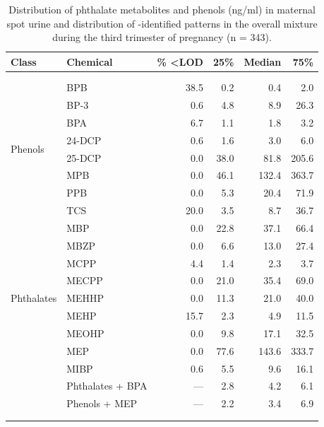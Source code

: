 \begingroup
\renewcommand{\arraystretch}{1.25}
\begin{table}[!ht] \centering 
  \caption[Distribution of phthalate metabolites and phenols]{Distribution of phthalate metabolites and phenols (ng/ml) in maternal spot urine and distribution of \bnmfc-identified patterns in the overall mixture during the third trimester of pregnancy (n = 343).}
  \label{tab:conc} 
\begin{tabular}{@{\extracolsep{5pt}} llrrrr} 
Class & Chemical & \% \textless LOD & 25\% & Median & 75\% \\ 
\hline 
\\[-3ex] \hline \\[-2.5ex]
\multirow{8}{*}{Phenols} & BPB    & 38.5 & 0.2  & 0.4 & 2.0 \\ 
& BP-3   & 0.6 & 4.8  & 8.9 & 26.3 \\ 
& BPA    & 6.7 & 1.1  & 1.8 & 3.2 \\ 
& 24-DCP & 0.6 & 1.6  & 3.0 & 6.0 \\ 
& 25-DCP & 0.0 & 38.0 & 81.8 & 205.6 \\ 
& MPB    & 0.0 & 46.1 & 132.4 & 363.7 \\ 
& PPB    & 0.0 & 5.3  & 20.4 & 71.9 \\ 
& TCS    & 20.0 & 3.5  & 8.7 & 36.7 \\ 
\hline
\multirow{9}{*}{Phthalates} & MBP    & 0.0 & 22.8 & 37.1 & 66.4 \\ 
& MBZP   & 0.0 & 6.6  & 13.0 & 27.4 \\ 
& MCPP   & 4.4 & 1.4  & 2.3 & 3.7 \\ 
& MECPP  & 0.0 & 21.0 & 35.4 & 69.0 \\ 
& MEHHP  & 0.0 & 11.3 & 21.0 & 40.0 \\ 
& MEHP   & 15.7 & 2.3  & 4.9 & 11.5 \\ 
& MEOHP  & 0.0 & 9.8  & 17.1 & 32.5 \\ 
& MEP    & 0.0 & 77.6 & 143.6 & 333.7 \\ 
& MIBP   & 0.6 & 5.5  & 9.6 & 16.1 \\ 
\hline 
 & Phthalates + BPA & --- & 2.8 & 4.2 & 6.1 \\
 & Phenols + MEP & --- & 2.2 & 3.4 & 6.9 \\
\hline
\\[-3ex] \hline \\[-2.5ex]
\end{tabular} 
\end{table} 
\endgroup

